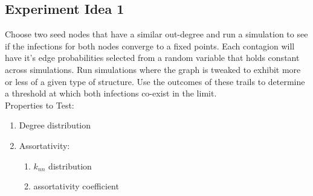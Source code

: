 \documentclass[11pt]{article}
\begin{document}
\subsection{Experiment Idea 1}
    Choose two seed nodes that have a similar out-degree and run a simulation to see if the infections for both nodes
    converge to a fixed points. Each contagion will have it's edge probabilities selected from a random variable that holds constant
    across simulations. Run simulations where the graph is tweaked  to exhibit more or less of a given type of structure. Use the outcomes of these trails to determine a threshold at which both infections co-exist in the limit. \\
    Properties to Test:
    \begin{enumerate}
        \item Degree distribution
        \item Assortativity:
        \begin{enumerate}
            \item $k_{nn}$ distribution
            \item assortativity coefficient
        \end{enumerate}
    \end{enumerate}
    
\end{document}
